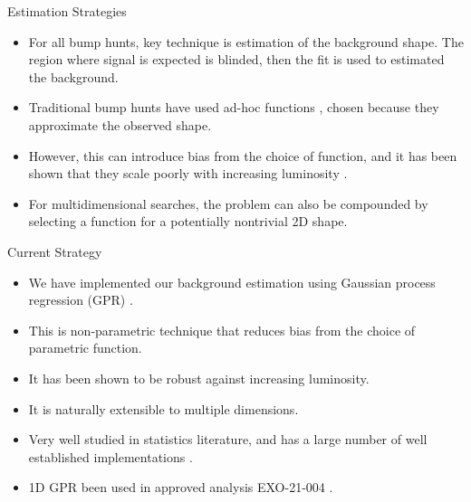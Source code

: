 \documentclass[10pt]{beamer}
\begin{document}
\begin{frame}{Estimation Strategies}
  \begin{splitcol}[0.55]
    \begin{col}
      \begin{itemize}
      \item For all bump hunts, key technique is estimation of the background shape.
        The region where signal is expected is blinded, then the fit is used to estimated the background.
      \item Traditional bump hunts have used ad-hoc functions \cite{zisopoulos_parametric_2023}, chosen because they approximate the observed shape. 
      \item However, this can introduce bias from the choice of function, and it has been shown that they scale poorly with increasing luminosity \cite{frate_modeling_2017}.
      \item For multidimensional searches, the problem can also be compounded by selecting a function for a potentially nontrivial 2D shape. 
      \end{itemize}
    \end{col}
    \begin{col}
      \begin{center}
      \end{center}
    \end{col}
  \end{splitcol}
\end{frame}

\begin{frame}{Current Strategy}
  \begin{itemize}
  \item We have implemented our background estimation using Gaussian process regression (GPR) \cite{rasmussen_gaussian_2006}.
  \item This is non-parametric technique that reduces bias from the choice of parametric function.
  \item It has been shown to be robust against increasing luminosity\cite{frate_modeling_2017}.
  \item It is naturally extensible to multiple dimensions.
  \item Very well studied in statistics literature\cite{rasmussen_gaussian_2006}, and has a large number of well established implementations \cite{noauthor_comparison_2024, gardner_gpytorch_2021}.
  \item 1D GPR been used in approved analysis EXO-21-004 \cite{cms_collaboration_searches_2024}.
  \end{itemize}
\end{frame}
\end{document}
